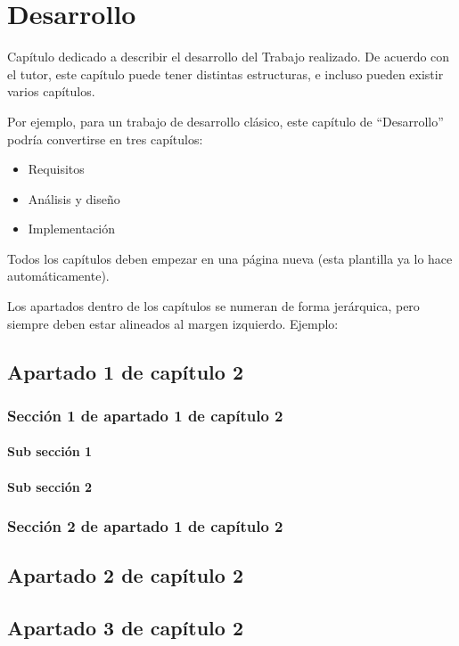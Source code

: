 \chapter{Desarrollo}
Capítulo dedicado a describir el desarrollo del Trabajo realizado. De acuerdo con el tutor, este capítulo puede tener distintas estructuras, e incluso pueden existir varios capítulos.

Por ejemplo, para un trabajo de desarrollo clásico, este capítulo de ``Desarrollo'' podría convertirse en tres capítulos:

\begin{itemize}
\item Requisitos
\item Análisis y diseño
\item Implementación
\end{itemize}

Todos los capítulos deben empezar en una página nueva (esta plantilla ya lo hace automáticamente).

Los apartados dentro de los capítulos se numeran de forma jerárquica, pero siempre deben estar alineados al margen izquierdo. Ejemplo:

\section{Apartado 1 de capítulo 2}

\subsection{Sección 1 de apartado 1 de capítulo 2}

\subsubsection{Sub sección 1}

\subsubsection{Sub sección 2}

\subsection{Sección 2 de apartado 1 de capítulo 2}

\section{Apartado 2 de capítulo 2}

\section{Apartado 3 de capítulo 2}
